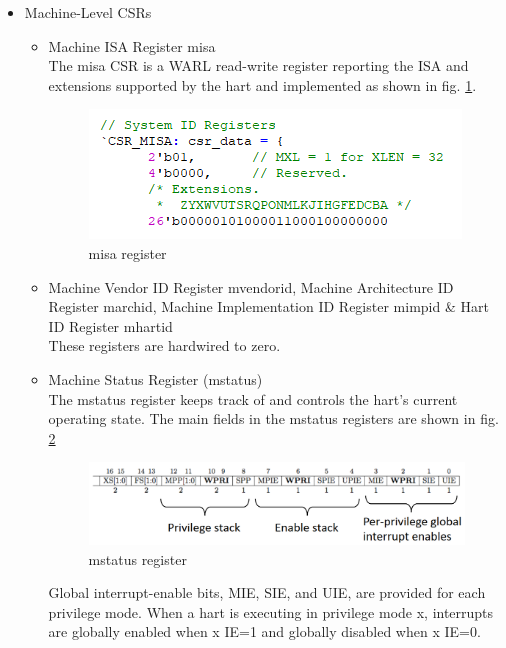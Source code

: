 \documentclass[../main.tex]{subfiles}
\begin{document}
\begin{itemize}
    \item[1- ]Machine-Level CSRs
        \begin{itemize}
            \item Machine ISA Register misa\\
            The misa CSR is a WARL read-write register reporting the ISA and extensions supported by the hart and implemented as shown in fig. \ref{fig:misa}.
            \begin{figure}[h]
            \centering
            \includegraphics[width=10 cm]{diagrams/misa.png}
            \caption{misa register}
            \label{fig:misa}
            \end{figure}
            \item Machine Vendor ID Register mvendorid, Machine Architecture ID Register marchid, Machine Implementation ID Register mimpid & Hart ID Register mhartid\\
            These registers are hardwired to zero.\\
            \item Machine Status Register (mstatus)\\
            The mstatus register keeps track of and controls the hart’s current operating state.
            The main fields in the mstatus registers are shown in fig. \ref{fig:mstatus}
            \begin{figure}[h]
            \centering
            \includegraphics[width=10 cm]{diagrams/mstatus.png}
            \caption{mstatus register}
            \label{fig:mstatus}
            \end{figure}
            Global interrupt-enable bits, MIE, SIE, and UIE, are provided for each privilege mode. When a hart is executing in privilege mode x, interrupts are globally enabled when x IE=1 and globally disabled when x IE=0.\\

\end{itemize}
\end{itemize}
\end{document}

